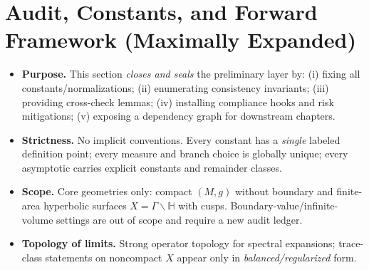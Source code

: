 
\section{Audit, Constants, and Forward Framework (Maximally Expanded)}
\label{sec:audit-constants-framework-max}

\begin{tcolorbox}[colback=gray!5,colframe=gray!35,
  title=Audit Discipline \& Closure Criteria (ZNB-9+++ • MEA-Core-SS • enforced)]
\begin{itemize}
  \item \textbf{Purpose.} This section \emph{closes and seals} the preliminary layer by: (i) fixing all constants/normalizations; (ii) enumerating consistency invariants; (iii) providing cross-check lemmas; (iv) installing compliance hooks and risk mitigations; (v) exposing a dependency graph for downstream chapters.
  \item \textbf{Strictness.} No implicit conventions. Every constant has a \emph{single} labeled definition point; every measure and branch choice is globally unique; every asymptotic carries explicit constants and remainder classes.
  \item \textbf{Scope.} Core geometries only: compact $(M,g)$ without boundary and finite-area hyperbolic surfaces $X=\Gamma\backslash\mathbb H$ with cusps. Boundary-value/infinite-volume settings are out of scope and require a new audit ledger.
  \item \textbf{Topology of limits.} Strong operator topology for spectral expansions; trace-class statements on noncompact $X$ appear only in \emph{balanced/regularized} form.
\end{itemize}
\end{tcolorbox}

